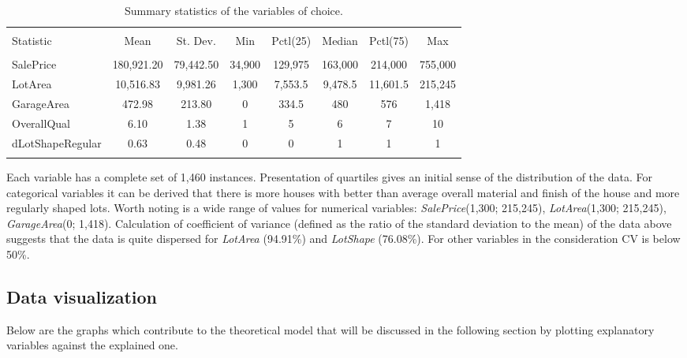 \documentclass{article}
\begin{document}
\begin{table}[!htbp]
\centering
\caption{\label{tab:descriptive} Summary statistics of the variables of choice.}
\begin{tabular}{@{\extracolsep{5pt}}lccccccc} 
\\[-1.8ex]\hline 
\hline \\[-1.8ex] 
Statistic & \multicolumn{1}{c}{Mean} & \multicolumn{1}{c}{St. Dev.} & \multicolumn{1}{c}{Min} & \multicolumn{1}{c}{Pctl(25)} & \multicolumn{1}{c}{Median} & \multicolumn{1}{c}{Pctl(75)} & \multicolumn{1}{c}{Max} \\ 
\hline \\[-1.8ex] 
SalePrice & 180,921.20 & 79,442.50 & 34,900 & 129,975 & 163,000 & 214,000 & 755,000 \\ 
LotArea & 10,516.83 & 9,981.26 & 1,300 & 7,553.5 & 9,478.5 & 11,601.5 & 215,245 \\ 
GarageArea & 472.98 & 213.80 & 0 & 334.5 & 480 & 576 & 1,418 \\ 
OverallQual & 6.10 & 1.38 & 1 & 5 & 6 & 7 & 10 \\ 
dLotShapeRegular & 0.63 & 0.48 & 0 & 0 & 1 & 1 & 1 \\ 
\hline \\[-1.8ex] 
\end{tabular} 
\end{table} 

Each variable has a complete set of 1,460 instances. Presentation of quartiles gives an initial sense of the distribution of the data. For categorical variables it can be derived that there is more houses with better than average overall material and finish of the house and more regularly shaped lots. Worth noting is a wide range of values for numerical variables: \emph{SalePrice}(1,300; 215,245), \emph{LotArea}(1,300; 215,245), \emph{GarageArea}(0; 1,418).
Calculation of coefficient of variance (defined as the ratio of the standard deviation to the mean) of the data above suggests that the data is quite dispersed for \emph{LotArea} (94.91\%) and \emph{LotShape} (76.08\%). For other variables in the consideration CV is below 50\%.

\subsection{Data visualization}

Below are the graphs which contribute to the theoretical model that will be discussed in the following section by plotting explanatory variables against the explained one. 
\end{document}
